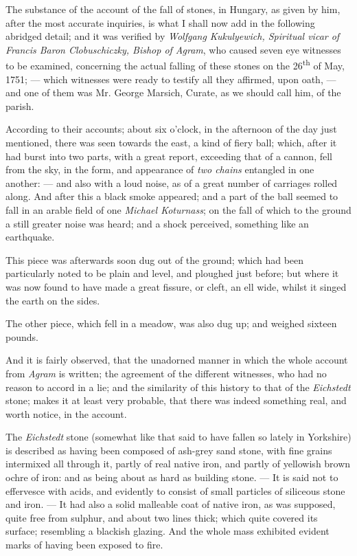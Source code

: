 \documentclass[a4paper, 12pt, oneside]{article}
\begin{document}
The substance of the account of the fall of stones, in Hungary, as given by him, after the most accurate inquiries, is what I shall now add in the following abridged detail; and it was verified by \emph{Wolfgang Kukulyewich, Spiritual vicar of Francis Baron Clobuschiczky, Bishop of Agram}, who caused seven eye witnesses to be examined, concerning the actual falling of these stones on the 26\textsuperscript{th} of May, 1751; --- which witnesses were ready to testify all they affirmed, upon oath, --- and one of them was Mr. George Marsich, Curate, as we should call him, of the parish.

According to their accounts; about six o'clock, in the afternoon of the day just mentioned, there was seen towards the east, a kind of fiery ball; which, after it had burst into two parts, with a great report, exceeding that of a cannon, fell from the sky, in the form, and appearance of \emph{two chains} entangled in one another: --- and also with a loud noise, as of a great number of carriages rolled along. And after this a black smoke appeared; and a part of the ball seemed to fall in an arable field of one \emph{Michael Koturnass}; on the fall of which to the ground a still greater noise was heard; and a shock perceived, something like an earthquake.

This piece was afterwards soon dug out of the ground; which had been particularly noted to be plain and level, and ploughed just before; but where it was now found to have made a great fissure, or cleft, an ell wide, whilst it singed the earth on the sides.

The other piece, which fell in a meadow, was also dug up; and weighed sixteen pounds.

And it is fairly observed, that the unadorned manner in which the whole account from \emph{Agram} is written; the agreement of the different witnesses, who had no reason to accord in a lie; and the similarity of this history to that of the \emph{Eichstedt} stone; makes it at least very probable, that there was indeed something real, and worth notice, in the account.

The \emph{Eichstedt} stone (somewhat like that said to have fallen so lately in Yorkshire) is described as having been composed of ash-grey sand stone, with fine grains intermixed all through it, partly of real native iron, and partly of yellowish brown ochre of iron: and as being about as hard as building stone. --- It is said not to effervesce with acids, and evidently to consist of small particles of siliceous stone and iron. --- It had also a solid malleable coat of native iron, as was supposed, quite free from sulphur, and about two lines thick; which quite covered its surface; resembling a blackish glazing. And the whole mass exhibited evident marks of having been exposed to fire.
\end{document}

